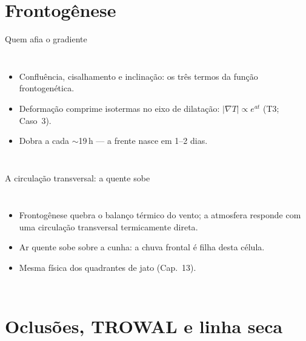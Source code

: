\documentclass[aspectratio=169,11pt]{beamer}
\begin{document}
\section{Frontogênese}

\begin{frame}{Quem afia o gradiente}
  \begin{columns}
    \begin{itemize}
      \item Confluência, cisalhamento e inclinação: os três termos da
            função frontogenética.
      \item Deformação comprime isotermas no eixo de dilatação:
            $|\nabla T| \propto e^{at}$ (T3; Caso~3).
      \item Dobra a cada $\sim$19\,h — a frente nasce em 1--2 dias.
    \end{itemize}
  \end{columns}
\end{frame}

\begin{frame}{A circulação transversal: a quente sobe}
  \begin{columns}
    \begin{itemize}
      \item Frontogênese quebra o balanço térmico do vento; a
            atmosfera responde com uma circulação transversal
            \alert{termicamente direta}.
      \item Ar quente sobe sobre a cunha: a chuva frontal é filha
            desta célula.
      \item Mesma física dos quadrantes de jato (Cap.~13).
    \end{itemize}
  \end{columns}
\end{frame}

\section{Oclusões, TROWAL e linha seca}
\end{document}
